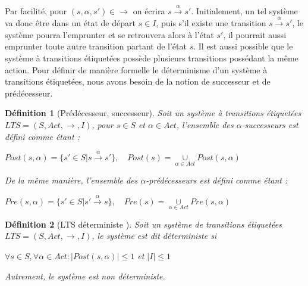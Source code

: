 \documentclass[11pt,a4paper,oneside]{book}
\theoremstyle{break}
\newtheorem{defin}{Définition}
\theoremstyle{breakplain}
\begin{document}
Par facilité, pour $(s, \alpha, s') \in \rightarrow$ on écrira $s\xrightarrow{\alpha}{}s'$. Initialement, un tel système va donc être dans un état de départ $s\in I$, puis s'il existe une transition $s\xrightarrow{\alpha}{}s'$, le système pourra l'emprunter et se retrouvera alors à l'état $s'$, il pourrait aussi emprunter toute autre transition partant de l'état $s$. Il est aussi possible que le système à transitions étiquetées possède plusieurs transitions possédant la même action. Pour définir de manière formelle le déterminisme d'un système à transitions étiquetées, nous avons besoin de la notion de successeur et de prédécesseur.


\begin{defin}[Prédécesseur, successeur\cite{baier2008principles}]
Soit un système à transitions étiquetées $LTS = (S, Act, \rightarrow, I)$, pour $s \in S$ et $\alpha \in Act$, l'ensemble des $\alpha$-successeurs est défini comme étant :
\begin{center}
$Post(s,\alpha) = \{ s' \in S | s\xrightarrow{\alpha}{}s' \}, \quad Post(s) = \underset{\alpha \in Act}{\cup} Post(s, \alpha)$
\end{center}
De la même manière, l'ensemble des $\alpha$-prédécesseurs est défini comme étant :
\begin{center}
$Pre(s,\alpha) = \{ s' \in S | s'\xrightarrow{\alpha}{}s \}, \quad Pre(s) = \underset{\alpha \in Act}{\cup} Pre(s, \alpha)$
\end{center}
\end{defin}

\begin{defin}[LTS déterministe \cite{baier2008principles}]
Soit un système de transitions étiquetées $LTS = (S, Act, \rightarrow, I)$, le système est dit déterministe si 
\begin{center}
$\forall s \in S, \forall \alpha \in Act : |Post(s,\alpha)| \leq 1$ et $|I| \leq 1$
\end{center}
Autrement, le système est non déterministe.
\end{defin}

\end{document}
